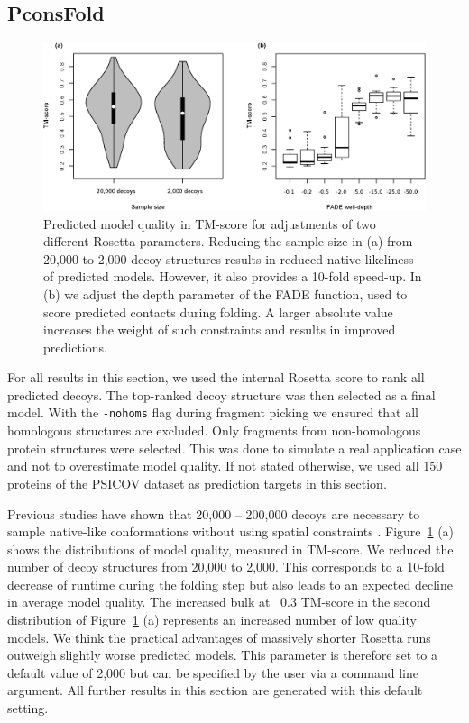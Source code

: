 \documentclass{bioinfo}
\begin{document}
\subsection{PconsFold}
\begin{figure}[!tpb]%
\centerline{\includegraphics[scale=0.7]{figures/rosetta.eps}}
\caption{Predicted model quality in TM-score for adjustments of two
  different Rosetta parameters. Reducing the sample size in (a) from
  20,000 to 2,000 decoy structures results in reduced
  native-likeliness of predicted models. However, it also provides a
  10-fold speed-up. In (b) we adjust the depth parameter of the FADE
  function, used to score predicted contacts during folding. A larger
  absolute value increases the weight of such constraints and results
  in improved predictions.}\label{fig:ros} 
\end{figure}
For all results in this section, we used the internal Rosetta score to
rank all predicted decoys. The top-ranked decoy structure was then
selected as a final model. With the {\tt -nohoms} flag during fragment
picking we ensured that all homologous structures are excluded. Only
fragments from non-homologous protein structures were selected. This
was done to simulate a real application case and not to overestimate
model quality. If not stated otherwise, we used all 150 proteins of
the PSICOV dataset as prediction targets in this section. 

Previous studies have shown that 20,000 -- 200,000 decoys are
necessary to sample native-like conformations without using spatial
constraints \cite[]{Simons10526365}. Figure~\ref{fig:ros} (a) shows the distributions of model quality, measured
in TM-score. We reduced the number of decoy structures from 20,000 to
2,000. This corresponds to a 10-fold decrease of runtime during the
folding step but also leads to an expected decline in average model
quality. The increased bulk at ~0.3 TM-score in the second
distribution of Figure~\ref{fig:ros} (a) represents an increased
number of low quality models. We think the practical advantages of
massively shorter Rosetta runs outweigh slightly worse predicted
models. This parameter is therefore set to a default value of 2,000
but can be specified by the user via a command line argument. All
further results in this section are generated with this default
setting. 
\end{document}
